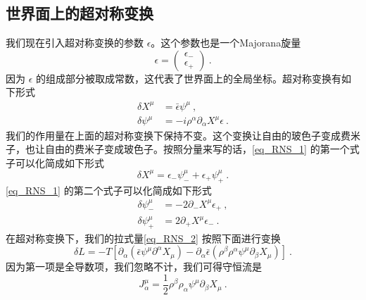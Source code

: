 \subsection{世界面上的超对称变换}
我们现在引入超对称变换的参数 $\epsilon$。这个参数也是一个Majorana旋量
\begin{equation}
\epsilon = \begin{pmatrix}
\epsilon_- \\
\epsilon_+
\end{pmatrix}~.
\end{equation}
因为 $\epsilon$ 的组成部分被取成常数，这代表了世界面上的全局坐标。超对称变换有如下形式
\begin{equation}\label{eq_RNS_1}
\begin{aligned}
\delta X^\mu & = \bar \epsilon \psi^\mu ~, \\
\delta \psi^\mu & = - i \rho^\alpha \partial_\alpha X^\mu \epsilon ~.   
\end{aligned}
\end{equation}
我们的作用量在上面的超对称变换下保持不变。这个变换让自由的玻色子变成费米子，也让自由的费米子变成玻色子。按照分量来写的话，\autoref{eq_RNS_1} 的第一个式子可以化简成如下形式
\begin{equation}
\delta X^\mu = \epsilon_- \psi_-^\mu + \epsilon_+ \psi_+^\mu~.
\end{equation}
\autoref{eq_RNS_1} 的第二个式子可以化简成如下形式
\begin{equation}
\begin{aligned}
\delta \psi_-^\mu & = -2\partial_-X^\mu \epsilon_+ ~, \\
\delta \psi_+^\mu & = 2 \partial_+ X^\mu \epsilon_-~.
\end{aligned}
\end{equation}
在超对称变换下，我们的拉式量\autoref{eq_RNS_2} 按照下面进行变换
\begin{equation}
\delta L = -T[ \partial_\alpha (\bar\epsilon\psi^\mu\partial^\alpha X_\mu) - \partial_\alpha \bar\epsilon (\rho^\beta\rho^\alpha\psi^\mu\partial_\beta X_\mu) ] ~.
\end{equation}
因为第一项是全导数项，我们忽略不计，我们可得守恒流是
\begin{equation}
J^\mu_\alpha = \frac{1}{2} \rho^\beta \rho_\alpha \psi^\mu \partial_\beta X_\mu ~.
\end{equation}

